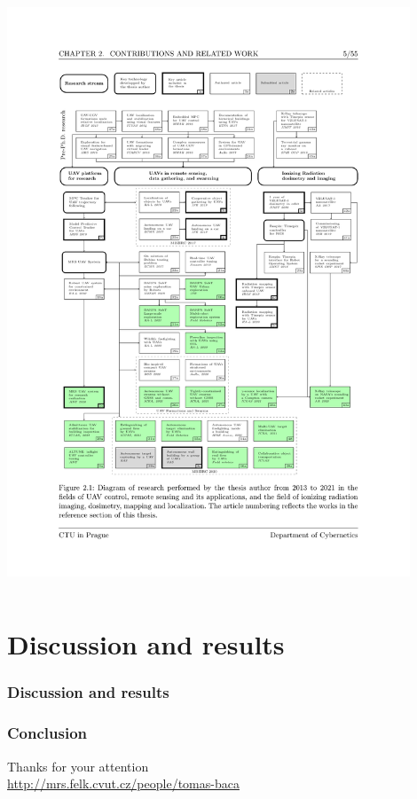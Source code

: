 \documentclass[aspectratio=169]{beamer}
\begin{document}
\begin{frame}
\begin{columns}[c]
\includegraphics[width=0.9\textwidth,trim={2.0cm 5.0cm 2.5cm 5.2cm},clip]{./fig/pubgraph.pdf}

\end{columns}

\end{frame}


\section{Discussion and results}


\begin{frame}
\frametitle{Discussion and results}



\end{frame}



\begin{frame}
  \frametitle{Conclusion}

  \begin{center}
    \huge Thanks for your attention\\
    \vspace{1em}
    \large \url{http://mrs.felk.cvut.cz/people/tomas-baca}
  \end{center}

\end{frame}
\end{document}
